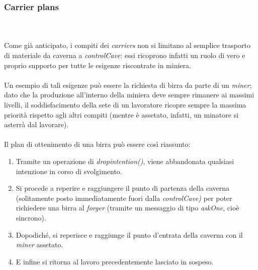 \documentclass{llncs}
\begin{document}
\subsubsection{Carrier plans}~\\\\
Come già anticipato, i compiti dei \textit{carriers} non si limitano al semplice trasporto di materiale da caverna a \textit{controlCave}: essi ricoprono infatti un ruolo di vero e proprio supporto per tutte le esigenze riscontrate in miniera.\\\\Un esempio di tali esigenze può essere la richiesta di birra da parte di un \textit{miner}; dato che la produzione all'interno della miniera deve sempre rimanere ai massimi livelli, il soddisfacimento della sete di un lavoratore ricopre sempre la massima priorità rispetto agli altri compiti (mentre è assetato, infatti, un minatore si asterrà dal lavorare).\\\\
Il plan di ottenimento di una birra può essere così riassunto:
\begin{enumerate}
	\item Tramite un operazione di \textit{drop\textunderscore intention()}, viene abbandonata qualsiasi intenzione in corso di svolgimento.\\
	\item Si procede a reperire e raggiungere il punto di partenza della caverna (solitamente posto immediatamente fuori dalla \textit{controlCave)} per poter richiedere una birra al \textit{forger} (tramite un messaggio di tipo \textit{askOne}, cioè sincrono).\\
	\item Dopodiché, si reperisce e raggiunge il punto d'entrata della caverna con il \textit{miner} assetato.\\
	\item E infine si ritorna al lavoro precedentemente lasciato in sospeso.
\end{enumerate}
\newpage
\end{document}
